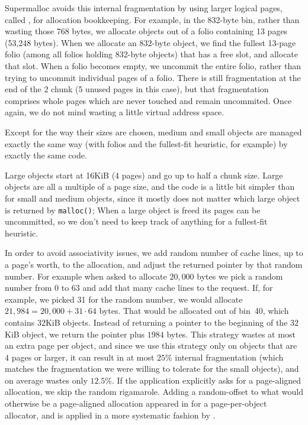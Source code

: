 \documentclass{sigplanconf}
\newcommand{\code}[1]{\texttt{#1}}
\begin{document}
Supermalloc avoids this internal fragmentation by using larger logical
pages, called , for allocation bookkeeping.  For example,
in the 832-byte bin, rather than wasting those 768 bytes, we allocate
objects out of a folio containing 13 pages (53,248 bytes). When we
allocate an 832-byte object, we find the fullest 13-page folio (among
all folios holding 832-byte objects) that has a free slot, and allocate
that slot.  When a folio becomes empty, we uncommit the entire folio,
rather than trying to uncommit individual pages of a folio.  There is
still fragmentation at the end of the \unit{2}\mebi\byte{} chunk (5
unused pages in this case), but that fragmentation comprises whole
pages which are never touched and remain uncommited.  Once again, we
do not mind wasting a little virtual address space.

Except for the way their sizes are chosen, medium and small objects
are managed exactly the same way (with folios and the fullest-fit
heuristic, for example) by exactly the same code.


Large objects start at 16KiB (4 pages) and go up to half a chunk size.
Large objects are all a multiple of a page size, and the code is a
little bit simpler than for small and medium objects, since it mostly
does not matter which large object is returned by \code{malloc()};
When a large object is freed its pages can be uncommitted, so we don't
need to keep track of anything for a fullest-fit heuristic.

In order to avoid associativity issues, we add random number of cache
lines, up to a page's worth, to the allocation, and adjust the
returned pointer by that random number.  For example when asked to
allocate $20,000$ bytes we pick a random number from 0 to 63 and add
that many cache lines to the request.  If, for example, we picked 31
for the random number, we would allocate $21,984 = 20,000+31\cdot64$
bytes.  That would be allocated out of bin~40, which contains $32$KiB
objects.  Instead of returning a pointer to the beginning of the
$32$KiB object, we return the pointer plus $1984$ bytes.  This
strategy wastes at most an extra page per object, and since we use
this strategy only on objects that are $4$ pages or larger, it can
result in at most $25$\% internal fragmentation (which matches the
fragmentation we were willing to tolerate for the small objects), and
on average wastes only $12.5$\%.  If the application explicitly asks
for a page-aligned allocation, we skip the random rigamarole.  Adding
a random-offset to what would otherwise be a page-aligned allocation
appeared in \cite{LvinNoBe08} for a page-per-object allocator, and is
applied in a more systematic fashion by \cite{AfekDiMo11}.
\end{document}
